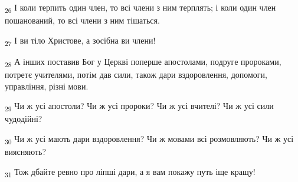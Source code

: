 \begin{tcolorbox}
\textsubscript{26} І коли терпить один член, то всі члени з ним терплять; і коли один член пошанований, то всі члени з ним тішаться.
\end{tcolorbox}
\begin{tcolorbox}
\textsubscript{27} І ви тіло Христове, а зосібна ви члени!
\end{tcolorbox}
\begin{tcolorbox}
\textsubscript{28} А інших поставив Бог у Церкві поперше апостолами, подруге пророками, потретє учителями, потім дав сили, також дари вздоровлення, допомоги, управління, різні мови.
\end{tcolorbox}
\begin{tcolorbox}
\textsubscript{29} Чи ж усі апостоли? Чи ж усі пророки? Чи ж усі вчителі? Чи ж усі сили чудодійні?
\end{tcolorbox}
\begin{tcolorbox}
\textsubscript{30} Чи ж усі мають дари вздоровлення? Чи ж мовами всі розмовляють? Чи ж усі виясняють?
\end{tcolorbox}
\begin{tcolorbox}
\textsubscript{31} Тож дбайте ревно про ліпші дари, а я вам покажу путь іще кращу!
\end{tcolorbox}
